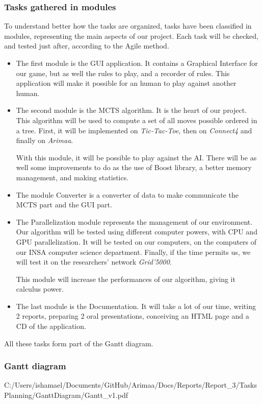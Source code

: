 \subsubsection{Tasks gathered in modules}

To understand better how the tasks are organized, tasks have been classified in modules, representing the main aspects of our project. Each task will be checked, and tested just after, according to the Agile method.

\begin{itemize}
  \item The first module is the GUI application. It contains a Graphical Interface for our game, but as well the rules to play, and a recorder of rules. 
This application will make it possible for an human to play against another human.
  \item The second module is the MCTS algorithm. It is the heart of our project. This algorithm will be used to compute a set of all moves possible ordered in a tree. First, it will be implemented on \textit{Tic-Tac-Toe}, then on \textit{Connect4} and finally on \textit{Arimaa}. 

With this module, it will be possible to play against the AI.
There will be as well some improvements to do as the use of Boost library, a better memory management, and making statistics.
  \item The module Converter is a converter of data to make communicate the MCTS part and the GUI part.
  \item The Parallelization module represents the management of our environment. Our algorithm will be tested using different computer powers, with CPU and GPU parallelization. It will be tested on our computers, on the computers of our INSA computer science department. Finally, if the time permits us, we will test it on the researchers' network \textit{Grid'5000}. 

This module will increase the performances of our algorithm, giving it calculus power.
  \item The last module is the Documentation. It will take a lot of our time, writing 2 reports, preparing 2 oral presentations, conceiving an HTML page and a CD of the application.
\end{itemize}
All these tasks form part of the Gantt diagram.

\subsubsection{Gantt diagram}

{C:/Users/ishamael/Documents/GitHub/Arimaa/Docs/Reports/Report_3/TasksPlanning/GanttDiagram/Gantt_v1.pdf}